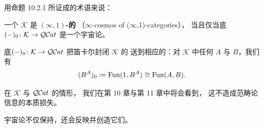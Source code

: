 用命题 10.2.1 所证成的术语来说： %

\begin{definition}\label{def:cosmos-of-infinity-one-categories}
一个\trInfinityCosmos{} $\mathcal{K}$ 是
\textbf{$(\infty,1)$-\trCategory{}的\trInfinityCosmos}
（$\infty$-cosmos of ($\infty$,1)-categories），
当且仅当底\trQuasiCategory\trFunctor $(-)_0\colon\mathcal{K}\to\mathcal{Q}\mathcal{C}at$
是一个宇宙论\trBiequivalence{}。
\end{definition}

\begin{remark}\label{rem:underlying-qcat-internal-homs}
底\trQuasiCategory\trFunctor $(-)_0\colon\mathcal{K}\to\mathcal{Q}\mathcal{C}at$
把笛卡尔封闭\trInfinityCosmos{} $\mathcal{K}$ 的\trInternalHom
送到相应的\trFunctorSpace{}：对 $\mathcal{K}$ 中任何\trInfinityCategory{}
$A$ 与 $B$，我们有
\[
(B^A)_0\coloneqq\operatorname{Fun}(1,B^A)\cong\operatorname{Fun}(A,B).
\]
\end{remark}
在\trInfinityCosmos{} $\mathcal{K}$ 与 $\mathcal{Q}\mathcal{C}at$
\trBiequivalence{}的情形，
我们在第 10 章与第 11 章中将会看到，
这不造成范畴论信息的本质损失。

宇宙论\trBiequivalence{}不仅保持\trEquivalence{}，还会反映并创造它们。

